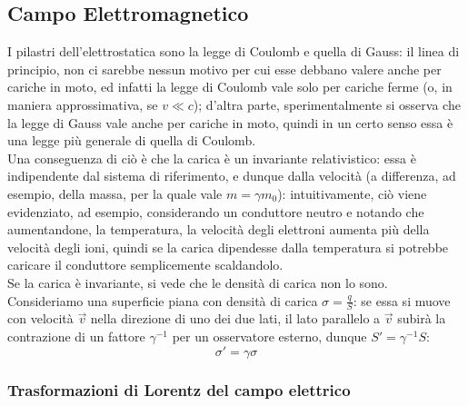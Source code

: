 \documentclass[]{article}
\begin{document}
\subsection{Campo Elettromagnetico}

I pilastri dell'elettrostatica sono la legge di Coulomb e quella di Gauss: il linea di principio, non ci sarebbe nessun motivo per cui esse debbano valere anche per cariche in moto, ed infatti la legge di Coulomb vale solo per cariche ferme (o, in maniera approssimativa, se $ v \ll c $); d'altra parte, sperimentalmente si osserva che la legge di Gauss vale anche per cariche in moto, quindi in un certo senso essa è una legge più generale di quella di Coulomb. \\ 
%
Una conseguenza di ciò è che la carica è un invariante relativistico: essa è indipendente dal sistema di riferimento, e dunque dalla velocità (a differenza, ad esempio, della massa, per la quale vale $ m = \gamma m_0 $): intuitivamente, ciò viene evidenziato, ad esempio, considerando un conduttore neutro e notando che aumentandone, la temperatura, la velocità degli elettroni aumenta più della velocità degli ioni, quindi se la carica dipendesse dalla temperatura si potrebbe caricare il conduttore semplicemente scaldandolo. \\ 
%
Se la carica è invariante, si vede che le densità di carica non lo sono. \\ 
%
Consideriamo una superficie piana con densità di carica $ \sigma = \frac{q}{S} $: se essa si muove con velocità $ \vec{v} $ nella direzione di uno dei due lati, il lato parallelo a $ \vec{v} $ subirà la contrazione di un fattore $ \gamma^{-1} $ per un osservatore esterno, dunque $ S' = \gamma^{-1} S $:
\begin{equation}
	\sigma' = \gamma\sigma
	\label{eq:27}
\end{equation}

\subsubsection{Trasformazioni di Lorentz del campo elettrico}
\end{document}
